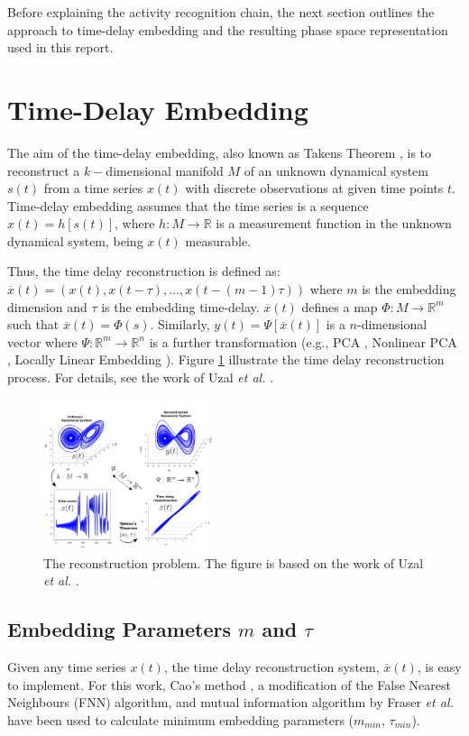 \documentclass[10pt,journal,compsoc]{IEEEtran}
\begin{document}
Before explaining the activity recognition chain, the next section outlines 
the approach to time-delay embedding and the resulting phase space representation 
used in this report. 

\section{Time-Delay Embedding}
The aim of the time-delay embedding, also known as Takens Theorem \cite{Takens1981}, 
is to reconstruct a $k-$dimensional manifold $M$ of an unknown dynamical system $s(t)$ 
from a time series $x(t)$ with discrete observations at given time points $t$. 
Time-delay embedding assumes that the time series 
is a sequence $x(t)=h[s(t)]$,  where  $h: M \rightarrow \mathbb{R}$ 
is a measurement function in the unknown dynamical system, being $x(t)$ measurable.

Thus, the time delay reconstruction is defined as:
$\overline{x}(t) = (x(t), x(t-\tau),...,x(t-(m-1)\tau))$ 
where $m$ is the embedding dimension and $\tau$ is the embedding time-delay.
$\overline{x}(t)$ defines a map $\varPhi: M \rightarrow \mathbb{R}^m$ such that 
$\overline{x}(t) = \varPhi(s)$.
Similarly, $y(t)= \varPsi [\overline{x}(t)]$ is a $n$-dimensional vector 
where $\varPsi: \mathbb{R}^m \rightarrow \mathbb{R}^n$ is a further transformation 
(e.g., PCA \cite{Shlens2014}, Nonlinear PCA \cite{Kruger2007}, 
Locally Linear Embedding \cite{Roweis2000}). Figure \ref{fig:takens_theorem} 
illustrate the time delay reconstruction process.
For details, see the work of Uzal \emph{et al.} \cite{Uzal2011}.

\begin{figure}[!htb]
\centering    
\includegraphics[width=0.45\textwidth]{takens_theorem_v6}
\caption[PA]{The reconstruction problem. The figure is based on the work of Uzal 
\emph{et al.} \cite{Uzal2011}.}
\label{fig:takens_theorem}
\end{figure}

\subsection{Embedding Parameters $m$ and $\tau$}
Given any time series $x(t)$, the time delay reconstruction system, $\overline{x}(t)$,
is easy to implement. For this work, Cao's method \cite{Cao1997}, a modification of the 
False Nearest Neighbours (FNN) algorithm, and mutual information algorithm by 
Fraser \emph{et al.} \cite{Fraser1986} have been used to calculate minimum embedding 
parameters ($m_{min}$, $\tau_{min}$).
\end{document}
